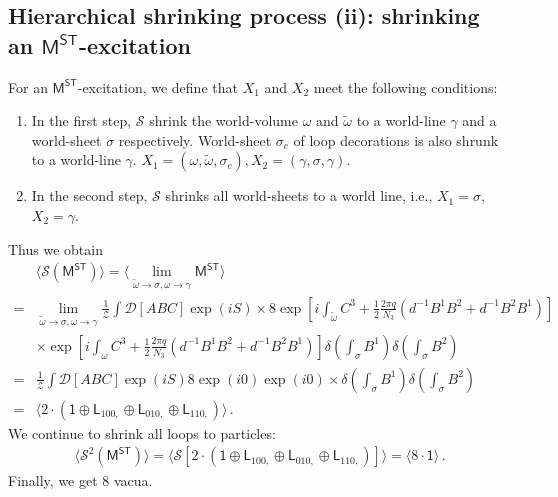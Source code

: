 \documentclass[11pt,nofootinbib,preprint]{revtex4-1}
\begin{document}
\subsection{Hierarchical shrinking process (ii): shrinking an $\mathsf{M^{ST}}$-excitation}

For an $\mathsf{M^{ST}}$-excitation, we define that $X_1$ and $X_2$ meet the following conditions:
\begin{enumerate}
	\item In the first step, $\mathcal{S}$  shrink the world-volume $\omega$ and $\tilde{\omega}$ to a world-line $\gamma$ and a world-sheet $\sigma$ respectively. World-sheet $\sigma_{c}$ of loop decorations is also shrunk to a world-line $\gamma$. $X_1=(\omega,\tilde{\omega},\sigma_{c}), X_2=(\gamma,\sigma,\gamma)$.
	\item In the second step, $\mathcal{S}$ shrinks all world-sheets
	to a world line, i.e., $X_1=\sigma$, $X_2=\gamma$.
\end{enumerate}
Thus we obtain 
\begin{align}
	&\langle \mathcal{S} \left( \mathsf{M^{ST}} \right) \rangle =\langle \underset{\tilde{\omega}\rightarrow \sigma,\omega \rightarrow \gamma}{\lim}\mathsf{M^{ST}} \rangle \nonumber
	\\
	=&\underset{\tilde{\omega}\rightarrow \sigma,\omega \rightarrow \gamma}{\lim}\frac{1}{\mathcal{Z}}\int{\mathcal{D} \left[ ABC \right] \exp \left( iS \right)} \times 8\exp \left[ i\int_{\tilde{\omega}}{C^3+\frac{1}{2}\frac{2\pi q}{N_3}\left( d^{-1}B^1B^2+d^{-1}B^2B^1 \right)} \right] \nonumber
	\\
	&\times \exp \left[ i\int_{\omega}{C^3+\frac{1}{2}\frac{2\pi q}{N_3}\left( d^{-1}B^1B^2+d^{-1}B^2B^1 \right)} \right] \delta \left( \int_{\sigma}{B^1} \right) \delta \left( \int_{\sigma}{B^2} \right) \nonumber
	\\
	=&\frac{1}{\mathcal{Z}}\int{\mathcal{D} \left[ ABC\right] \exp \left( iS \right) 8\exp \left( i0 \right)}\exp \left( i0 \right) \times \delta \left( \int_{\sigma}{B^1} \right) \delta \left( \int_{\sigma}{B^2} \right) \nonumber
	\\
	=&\langle 2\cdot\left(\mathsf{1}\oplus \mathsf{L}_{100,}\oplus \mathsf{L}_{010,}\oplus \mathsf{L}_{110,}\right) \rangle \,.
\end{align}
We continue to shrink all loops to particles:  
\begin{align}
	\langle \mathcal{S} ^2\left( \mathsf{M^{ST}} \right) \rangle =\langle \mathcal{S} \left[ 2\cdot \left( \mathsf{1}\oplus \mathsf{L}_{100,}\oplus \mathsf{L}_{010,}\oplus \mathsf{L}_{110,} \right) \right]  \rangle =\langle 8\cdot \mathsf{1} \rangle \,.
\end{align}
Finally, we get $8$ vacua.
\end{document}
